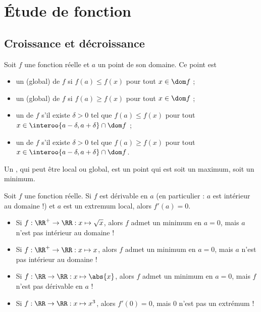 \section{Étude de fonction}
\subsection{Croissance et décroissance}
\begin{frame}
  \begin{definition}\label{extremum}
    Soit \(f\) une fonction réelle et \(a\) un point de son domaine. Ce point est
    \begin{itemize}[<+->]
    \item un  (global) de \(f\) si \(f(a) \leq f(x)\) pour tout \(x \in \dom f\) ;
    \item un  (global) de \(f\) si \(f(a) \geq f(x)\) pour tout \(x \in \dom f\) ;
    \item un  de \(f\) s'il existe \(\delta > 0\) tel que \(f(a) \leq f(x)\) pour tout \(x \in \interoo{a-\delta,a+\delta}\cap \dom f\) ;
    \item un  de \(f\) s'il existe \(\delta > 0\) tel que \(f(a) \geq f(x)\) pour tout \(x \in \interoo{a-\delta,a+\delta}\cap \dom f\).
    \end{itemize}\pause{}
    Un , qui peut être local ou global, est un point qui est soit un maximum, soit un minimum.
  \end{definition}
  \begin{theorem}\label{extremaderivee}\pause{}
    Soit \(f\) une fonction réelle.\pause{} Si \(f\) est dérivable en \(a\) (en particulier : \(a\) est intérieur au domaine !)\pause{} et \(a\) est un extremum local,\pause{} alors \(f'(a) = 0\).
  \end{theorem}
\end{frame}
\begin{frame}%
  \begin{example}
    \begin{itemize}[<+->]
    \item Si \(f : \RR^+ \to \RR : x \mapsto \sqrt{x}\)\pause, alors \(f\) admet un minimum en \(a = 0\)\pause, mais \(a\) n'est pas intérieur au domaine !
    \item Si \(f : \RR^+ \to \RR : x \mapsto x\)\pause, alors \(f\) admet un minimum en \(a = 0\)\pause, mais \(a\) n'est pas intérieur au domaine !
    \item Si \(f : \RR \to \RR : x \mapsto \abs{x}\)\pause, alors \(f\) admet un minimum en \(a = 0\)\pause, mais \(f\) n'est pas dérivable en \(a\) !
    \item Si \(f : \RR \to \RR : x \mapsto x^{3}\)\pause, alors \(f'(0) = 0\)\pause, mais \(0\) n'est pas un extrémum !
    \end{itemize}
  \end{example}
\end{frame}
